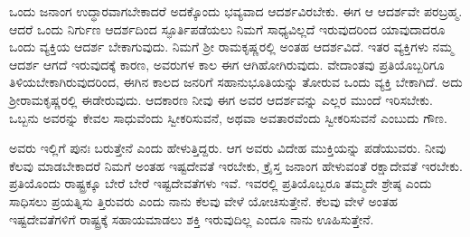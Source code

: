 ಒಂದು ಜನಾಂಗ ಉದ್ಧಾರವಾಗಬೇಕಾದರೆ ಅದಕ್ಕೊಂದು ಭವ್ಯವಾದ ಆದರ್ಶವಿರಬೇಕು. ಈಗ ಆ ಆದರ್ಶವೇ ಪರಬ್ರಹ್ಮ. ಆದರೆ ಒಂದು ನಿರ್ಗುಣ ಆದರ್ಶದಿಂದ ಸ್ಫೂರ್ತಿಪಡೆಯಲು ನಿಮಗೆ ಸಾಧ್ಯವಿಲ್ಲದೆ ಇರುವುದರಿಂದ ಯಾವುದಾದರೂ ಒಂದು ವ್ಯಕ್ತಿಯ ಆದರ್ಶ ಬೇಕಾಗುವುದು. ನಿಮಗೆ ಶ‍್ರೀ ರಾಮಕೃಷ್ಣರಲ್ಲಿ ಅಂತಹ ಆದರ್ಶವಿದೆ. ಇತರ ವ್ಯಕ್ತಿಗಳು ನಮ್ಮ ಆದರ್ಶ ಆಗದೆ ಇರುವುದಕ್ಕೆ ಕಾರಣ, ಅವರುಗಳ ಕಾಲ ಈಗ ಆಗಿಹೋಗಿರುವುದು. ವೇದಾಂತವು ಪ್ರತಿಯೊಬ್ಬರಿಗೂ ತಿಳಿಯಬೇಕಾಗಿರುವುದರಿಂದ, ಈಗಿನ ಕಾಲದ ಜನರಿಗೆ ಸಹಾನುಭೂತಿಯನ್ನು ತೋರುವ ಒಂದು ವ್ಯಕ್ತಿ ಬೇಕಾಗಿದೆ. ಅದು ಶ‍್ರೀರಾಮಕೃಷ್ಣರಲ್ಲಿ ಈಡೇರುವುದು. ಆದಕಾರಣ ನೀವು ಈಗ ಅವರ ಆದರ್ಶವನ್ನು ಎಲ್ಲರ ಮುಂದೆ ಇರಿಸಬೇಕು. ಒಬ್ಬನು ಅವರನ್ನು ಕೇವಲ ಸಾಧುವೆಂದು ಸ್ವೀಕರಿಸುವನೆ, ಅಥವಾ ಅವತಾರವೆಂದು ಸ್ವೀಕರಿಸುವನೆ ಎಂಬುದು ಗೌಣ.

ಅವರು ಇಲ್ಲಿಗೆ ಪುನಃ ಬರುತ್ತೇನೆ ಎಂದು ಹೇಳುತ್ತಿದ್ದರು. ಆಗ ಅವರು ವಿದೇಹ ಮುಕ್ತಿಯನ್ನು ಪಡೆಯುವರು. ನೀವು ಕೆಲವು ಮಾಡಬೇಕಾದರೆ ನಿಮಗೆ ಅಂತಹ ಇಷ್ಟದೇವತೆ ಇರಬೇಕು, ಕ್ರೈಸ್ತ ಜನಾಂಗ ಹೇಳುವಂತೆ ರಕ್ಷಾದೇವತೆ ಇರಬೇಕು. ಪ್ರತಿಯೊಂದು ರಾಷ್ಟ್ರಕ್ಕೂ ಬೇರೆ ಬೇರೆ ಇಷ್ಟದೇವತೆಗಳು ಇವೆ. ಇವರಲ್ಲಿ ಪ್ರತಿಯೊಬ್ಬರೂ ತಮ್ಮದೇ ಶ್ರೇಷ್ಠ ಎಂದು ಸಾಧಿಸಲು ಪ್ರಯತ್ನಿಸು ತ್ತಿರುವರು ಎಂದು ನಾನು ಕೆಲವು ವೇಳೆ ಯೋಚಿಸುತ್ತೇನೆ. ಕೆಲವು ವೇಳೆ ಅಂತಹ ಇಷ್ಟದೇವತೆಗಳಿಗೆ ರಾಷ್ಟ್ರಕ್ಕೆ ಸಹಾಯಮಾಡಲು ಶಕ್ತಿ ಇರುವುದಿಲ್ಲ ಎಂದೂ ನಾನು ಊಹಿಸುತ್ತೇನೆ.

